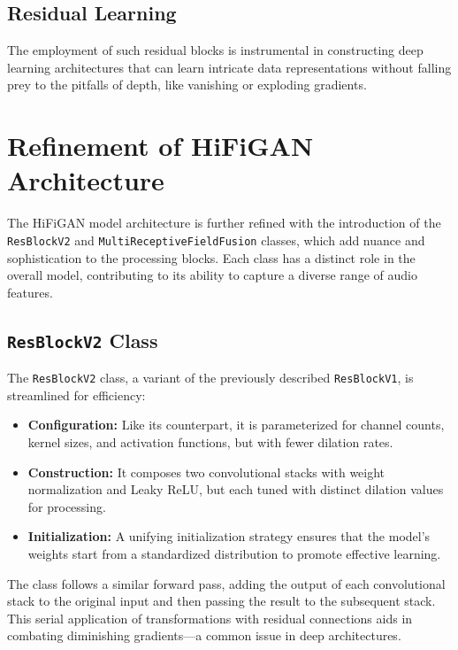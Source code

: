 \documentclass[a4paper]{article}
\begin{document}
\subsection{Residual Learning}

The employment of such residual blocks is instrumental in constructing deep learning architectures that can learn intricate data representations without falling prey to the pitfalls of depth, like vanishing or exploding gradients.



\section{Refinement of HiFiGAN Architecture}

The HiFiGAN model architecture is further refined with the introduction of the \texttt{ResBlockV2} and \texttt{MultiReceptiveFieldFusion} classes, which add nuance and sophistication to the processing blocks. Each class has a distinct role in the overall model, contributing to its ability to capture a diverse range of audio features.

\subsection{\texttt{ResBlockV2} Class}

The \texttt{ResBlockV2} class, a variant of the previously described \texttt{ResBlockV1}, is streamlined for efficiency:

\begin{itemize}
  \item \textbf{Configuration:} Like its counterpart, it is parameterized for channel counts, kernel sizes, and activation functions, but with fewer dilation rates. 
  
  \item \textbf{Construction:} It composes two convolutional stacks with weight normalization and Leaky ReLU, but each tuned with distinct dilation values for processing.
  
  \item \textbf{Initialization:} A unifying initialization strategy ensures that the model's weights start from a standardized distribution to promote effective learning.
\end{itemize}

The class follows a similar forward pass, adding the output of each convolutional stack to the original input and then passing the result to the subsequent stack. This serial application of transformations with residual connections aids in combating diminishing gradients—a common issue in deep architectures.
\end{document}
